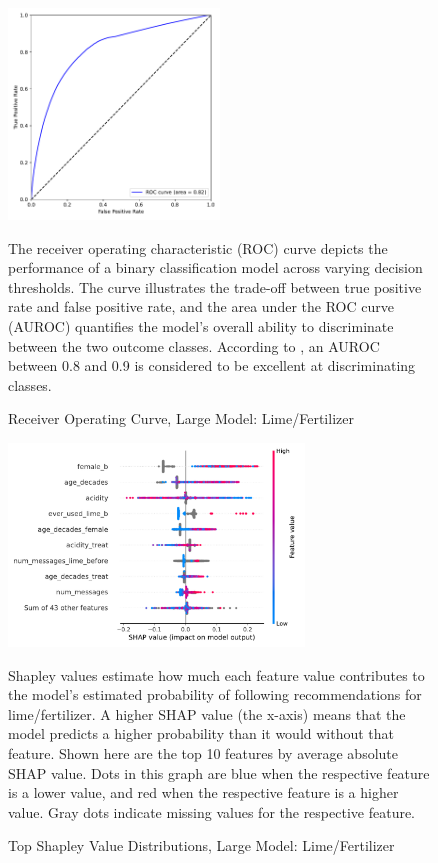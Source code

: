 \documentclass[12pt]{article}
\begin{document}
\begin{figure}[H]
    \centering
    \caption{Receiver Operating Curve, Large Model: Lime/Fertilizer}
    \includegraphics[width=0.5\textwidth]{../output/lightgbm_roc_combined.pdf}
    \begin{minipage}{0.6\textwidth}
    \tiny
    The receiver operating characteristic (ROC) curve depicts the performance of a binary classification model across varying decision thresholds. The curve illustrates the trade-off between true positive rate and false positive rate, and the area under the ROC curve (AUROC) quantifies the model's overall ability to discriminate between the two outcome classes. According to \textcite{mandrekar_receiver_2010}, an AUROC between 0.8 and 0.9 is considered to be excellent at discriminating classes.
    \end{minipage}
    \label{fig:roc_combined}
\end{figure}

\begin{figure}[H]
    \centering
    \caption{Top Shapley Value Distributions, Large Model: Lime/Fertilizer}
    \includegraphics[width=0.7\textwidth]{../output/shap_beeswarm_combined.pdf}
    \begin{minipage}{0.7\textwidth}
    \tiny
    Shapley values estimate how much each feature value contributes to the model's estimated probability of following recommendations for lime/fertilizer. A higher SHAP value (the x-axis) means that the model predicts a higher probability than it would without that feature. Shown here are the top 10 features by average absolute SHAP value. Dots in this graph are blue when the respective feature is a lower value, and red when the respective feature is a higher value. Gray dots indicate missing values for the respective feature.
    \end{minipage}
    \label{fig:shap_combined}
\end{figure}
\end{document}
